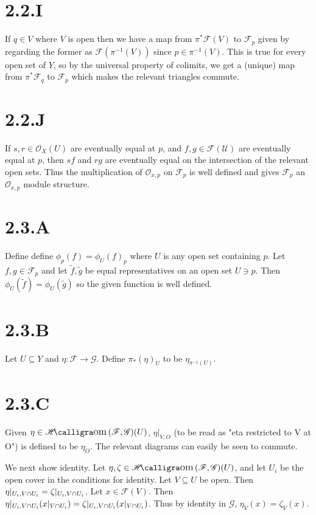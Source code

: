 \documentclass{article}
\begin{document}
\section*{2.2.I}
If $q \in V$ where $V$ is open then we have a map from $\pi^*\mathscr{F}(V)$ to
$\mathscr{F}_p$ given by regarding the former as $\mathscr{F}(\pi^{-1}(V))$ since
$p \in \pi^{-1}(V)$. This is true for every open set of $Y$, so by the universal property
of colimits, we get a (unique) map from $\pi^*\mathscr{F}_q$ to $\mathscr{F}_p$ which
makes the relevant triangles commute.

\section*{2.2.J}
If $s, r \in \mathscr{O}_X(U)$ are eventually equal at $p$, and $f, g \in \mathscr{F(U)}$ are eventually
equal at $p$, then $sf$ and $rg$ are eventually equal on the intersection of the relevant open sets.
Thus the multiplication of $\mathscr{O}_{x,p}$ on $\mathscr{F}_p$ is well defined
and gives $\mathscr{F}_p$ an $\mathscr{O}_{x,p}$ module structure.

\section*{2.3.A}
Define  define $\phi_p(f)=\phi_U(f)_p$ where $U$ is any open set containing $p$.
Let $f,g \in \mathscr{F}_p$ and let $\widetilde{f}, \widetilde{g}$ be equal representatives on an
open set $U \ni p$. Then $\phi_U(\widetilde{f})=\phi_U(\widetilde{g})$
so the given function is well defined.

\section*{2.3.B}
Let $U \subseteq Y$ and $\eta: \mathscr{F} \to \mathscr{G}$. Define $\pi_*(\eta)_U$ to be
$\eta_{\pi^{-1}(U)}$.

\section*{2.3.C}
Given $\eta \in \Hom(\mathscr{F},\mathscr{G})(U)$,
$\eta|_{V,O}$ (to be read as "eta restricted to V at O") is defined to be $\eta_O$. The relevant diagrams can
easily be seen to commute.

We next show identity. Let $\eta, \zeta \in \Hom(\mathscr{F},\mathscr{G})(U)$,
and let ${U_i}$ be the open cover in the conditions for identity. Let $V \subseteq U$ be open.
Then $\eta|_{U_i,V \cap U_i} = \zeta|_{U_i,V \cap U_i}$.
Let $x \in \mathscr{F}(V)$. Then $\eta|_{U_i,V \cap U_i}(x|_{V \cap U_i})= \zeta|_{U_i,V \cap U_i}(x|_{V \cap U_i})$.
Thus by identity in $\mathscr{G}$, $\eta_V(x)=\zeta_V(x)$.
\end{document}
